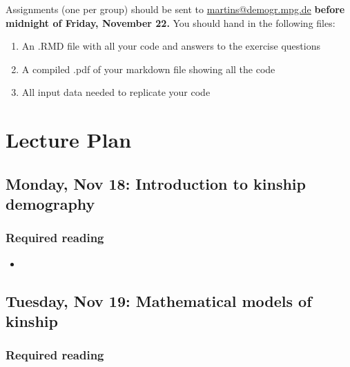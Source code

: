 ﻿\documentclass{article}
\begin{document}
Assignments (one per group) should be sent to \href{mailto:martins@demogr.mpg.de}{martins@demogr.mpg.de} \textbf{before midnight of Friday, November 22.} 
You should hand in the following files:
\begin{enumerate}
    \item An .RMD file with all your code and answers to the exercise questions
    \item A compiled .pdf of your markdown file showing all the code
    \item All input data needed to replicate your code 
\end{enumerate}


\section{Lecture Plan}

\subsection*{Monday, Nov 18: Introduction to kinship demography}

\subsubsection*{Required reading}

\begin{itemize}
    \item {}
\end{itemize}



\subsection*{Tuesday, Nov 19: Mathematical models of kinship}

\subsubsection*{Required reading}
\end{document}
